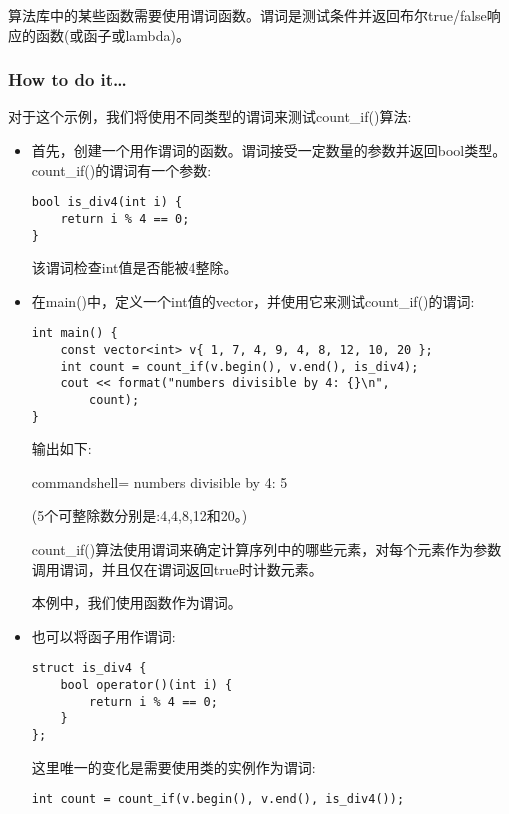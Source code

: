
算法库中的某些函数需要使用谓词函数。谓词是测试条件并返回布尔true/false响应的函数(或函子或lambda)。

\subsubsection{How to do it…}

对于这个示例，我们将使用不同类型的谓词来测试count\_if()算法:

\begin{itemize}
\item 
首先，创建一个用作谓词的函数。谓词接受一定数量的参数并返回bool类型。count\_if()的谓词有一个参数:

\begin{lstlisting}[style=styleCXX]
bool is_div4(int i) {
	return i % 4 == 0;
}
\end{lstlisting}

该谓词检查int值是否能被4整除。

\item 
在main()中，定义一个int值的vector，并使用它来测试count\_if()的谓词:

\begin{lstlisting}[style=styleCXX]
int main() {
	const vector<int> v{ 1, 7, 4, 9, 4, 8, 12, 10, 20 };
	int count = count_if(v.begin(), v.end(), is_div4);
	cout << format("numbers divisible by 4: {}\n",
		count);
}
\end{lstlisting}

输出如下:

\begin{tcblisting}{commandshell={}}
numbers divisible by 4: 5
\end{tcblisting}

(5个可整除数分别是:4,4,8,12和20。)

count\_if()算法使用谓词来确定计算序列中的哪些元素，对每个元素作为参数调用谓词，并且仅在谓词返回true时计数元素。

本例中，我们使用函数作为谓词。

\item 
也可以将函子用作谓词:

\begin{lstlisting}[style=styleCXX]
struct is_div4 {
	bool operator()(int i) {
		return i % 4 == 0;
	}
};
\end{lstlisting}

这里唯一的变化是需要使用类的实例作为谓词:

\begin{lstlisting}[style=styleCXX]
int count = count_if(v.begin(), v.end(), is_div4());
\end{lstlisting}


\end{itemize}
